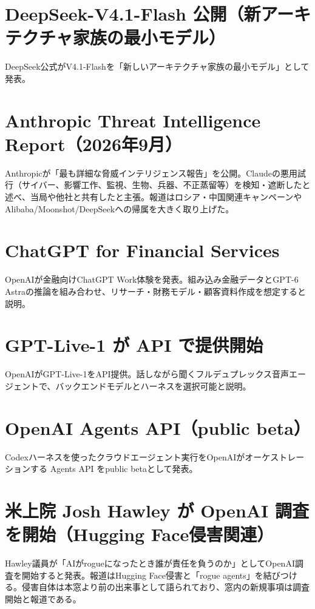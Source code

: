 \section{DeepSeek-V4.1-Flash 公開（新アーキテクチャ家族の最小モデル）}
DeepSeek公式がV4.1-Flashを「新しいアーキテクチャ家族の最小モデル」として発表。

\section{Anthropic Threat Intelligence Report（2026年9月）}
Anthropicが「最も詳細な脅威インテリジェンス報告」を公開。Claudeの悪用試行（サイバー、影響工作、監視、生物、兵器、不正蒸留等）を検知・遮断したと述べ、当局や他社と共有したと主張。報道はロシア・中国関連キャンペーンやAlibaba/Moonshot/DeepSeekへの帰属を大きく取り上げた。

\section{ChatGPT for Financial Services}
OpenAIが金融向けChatGPT Work体験を発表。組み込み金融データとGPT-6 Astraの推論を組み合わせ、リサーチ・財務モデル・顧客資料作成を想定すると説明。

\section{GPT-Live-1 が API で提供開始}
OpenAIがGPT-Live-1をAPI提供。話しながら聞くフルデュプレックス音声エージェントで、バックエンドモデルとハーネスを選択可能と説明。

\section{OpenAI Agents API（public beta）}
Codexハーネスを使ったクラウドエージェント実行をOpenAIがオーケストレーションする Agents API をpublic betaとして発表。

\section{米上院 Josh Hawley が OpenAI 調査を開始（Hugging Face侵害関連）}
Hawley議員が「AIがrogueになったとき誰が責任を負うのか」としてOpenAI調査を開始すると発表。報道はHugging Face侵害と「rogue agents」を結びつける。侵害自体は本窓より前の出来事として語られており、窓内の新規事項は調査開始と報道である。

